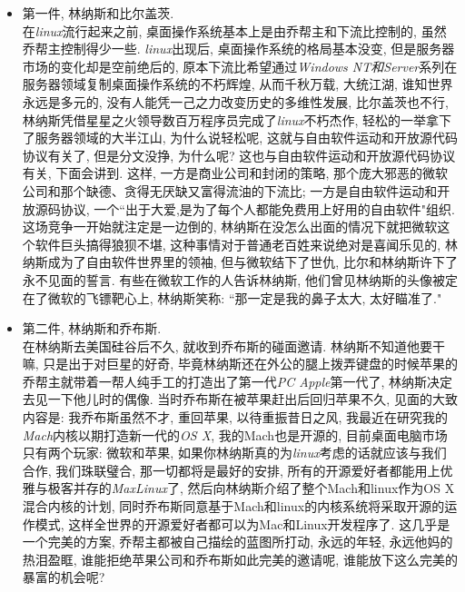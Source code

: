 \documentclass[utf8]{book}
\begin{document}
	\begin{itemize}
		\item {\small 
			第一件, 林纳斯和比尔盖茨. 
			\\ \indent
			在\textit{linux}流行起来之前, 桌面操作系统基本上是由乔帮主和下流比控制的, 虽然乔帮主控制得少一些. \textit{linux}出现后, 桌面操作系统的格局基本没变, 但是服务器市场的变化却是空前绝后的, 原本下流比希望通过\textit{Windows NT和Server}系列在服务器领域复制桌面操作系统的不朽辉煌, 从而千秋万载, 大统江湖, 谁知世界永远是多元的, 没有人能凭一己之力改变历史的多维性发展, 比尔盖茨也不行, 林纳斯凭借星星之火领导数百万程序员完成了\textit{linux}不朽杰作, 轻松的一举拿下了服务器领域的大半江山, 为什么说轻松呢, 这就与自由软件运动和开放源代码协议有关了, 但是分文没挣, 为什么呢? 这也与自由软件运动和开放源代码协议有关, 下面会讲到. 这样, 一方是商业公司和封闭的策略, 那个庞大邪恶的微软公司和那个缺德、贪得无厌缺又富得流油的下流比; 一方是自由软件运动和开放源码协议, 一个``出于大爱,是为了每个人都能免费用上好用的自由软件"组织. 这场竞争一开始就注定是一边倒的, 林纳斯在没怎么出面的情况下就把微软这个软件巨头搞得狼狈不堪, 这种事情对于普通老百姓来说绝对是喜闻乐见的, 林纳斯成为了自由软件世界里的领袖, 但与微软结下了世仇, 比尔和林纳斯许下了永不见面的誓言.
			有些在微软工作的人告诉林纳斯, 他们曾见林纳斯的头像被定在了微软的飞镖靶心上, 林纳斯笑称: ``那一定是我的鼻子太大, 太好瞄准了."}
		
		\item  {\small 
			第二件, 林纳斯和乔布斯.
			\\ \indent
			在林纳斯去美国硅谷后不久, 就收到乔布斯的碰面邀请. 林纳斯不知道他要干嘛, 只是出于对巨星的好奇, 毕竟林纳斯还在外公的腿上拨弄键盘的时候苹果的乔帮主就带着一帮人纯手工的打造出了第一代\textit{PC Apple}第一代了, 林纳斯决定去见一下他儿时的偶像. 当时乔布斯在被苹果赶出后回归苹果不久, 见面的大致内容是: 我乔布斯虽然不才, 重回苹果, 以待重振昔日之风, 我最近在研究我的\textit{Mach}内核以期打造新一代的\textit{OS X}, 我的Mach也是开源的, 目前桌面电脑市场只有两个玩家: 微软和苹果, 如果你林纳斯真的为\textit{linux}考虑的话就应该与我们合作, 我们珠联璧合, 那一切都将是最好的安排, 所有的开源爱好者都能用上优雅与极客并存的\textit{MaxLinux}了, 然后向林纳斯介绍了整个Mach和linux作为OS X混合内核的计划, 同时乔布斯同意基于Mach和linux的内核系统将采取开源的运作模式, 这样全世界的开源爱好者都可以为Mac和Linux开发程序了. 这几乎是一个完美的方案, 乔帮主都被自己描绘的蓝图所打动, 永远的年轻, 永远他妈的热泪盈眶, 谁能拒绝苹果公司和乔布斯如此完美的邀请呢, 谁能放下这么完美的暴富的机会呢? }
			

\end{itemize}
\end{document}

